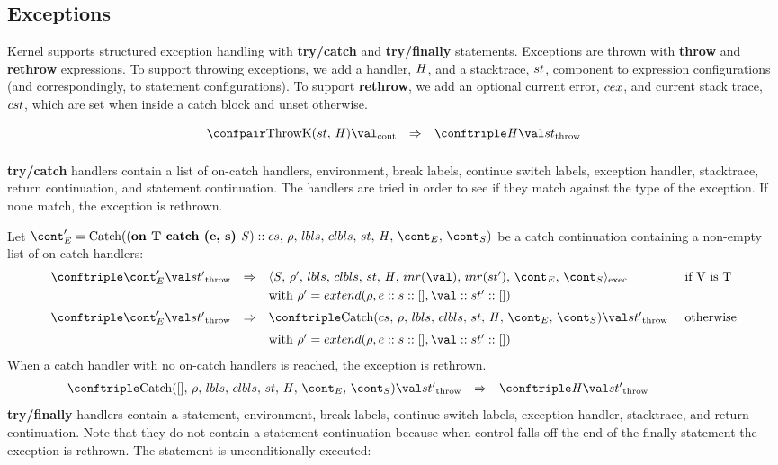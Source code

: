 \documentclass{article}
\begin{document}
\subsection{Exceptions}

Kernel supports structured exception handling with \textbf{try/catch} and \textbf{try/finally} statements. Exceptions are thrown with \textbf{throw} and \textbf{rethrow} expressions. To support throwing exceptions, we add a handler, $\mathit{H}$, and a stacktrace, $st$, component to expression configurations (and correspondingly, to statement configurations). To support \textbf{rethrow}, we add an optional current error, $cex$, and current stack trace, $cst$, which are set when inside a catch block and unset otherwise.

\[
  \begin{array}{lcl}
	\contconf{\ThrowH{\strace}{\handler}}{\val}
	& \Rightarrow &
	\throwconf{\handler}{\val}{\strace}\\[2mm]

  \end{array}
\]

\noindent
\textbf{try/catch} handlers contain a list of on-catch handlers, environment, break labels, continue switch labels, exception handler, stacktrace, return continuation, and statement continuation. The handlers are tried in order to see if they match against the type of the exception. If none match, the exception is rethrown.

\noindent
Let $\econt' = \CatchH{(\textbf{on T catch (e, s) }\stmt) :: cs}$ be a catch continuation containing a non-empty list of on-catch handlers:
\[
  \begin{array}{lcll}
	\throwconf{\econt'}{\val}{\strace'}
	& \Rightarrow &
	\execconf{\stmt}{\env'}{\lbls}{\clbls}{\handler}{inr(\val)}{inr(\strace')}{\econt}{\scont}
	&\textrm{ if V is T}\\[1mm]

	&&\textrm{with } \env' = extend(\env, e :: s :: [], \val :: \strace' :: [])\\[2mm]

	\throwconf{\econt'}{\val}{\strace'}
	& \Rightarrow &
	\throwconf{\CatchH{cs}}{\val}{\strace'}	&\textrm{ otherwise}\\[2mm]
	&&\textrm{with } \env' = extend(\env, e :: s :: [], \val :: \strace' :: [])
  \end{array}
\]
\noindent
When a catch handler with no on-catch handlers is reached, the exception is rethrown.
\[
  \begin{array}{lcll}
	\throwconf{\CatchH{[]}}{\val}{\strace'}
	& \Rightarrow &
	\throwconf{\handler}{\val}{\strace'}\hspace{20mm}
  \end{array}
\]
\noindent
\textbf{try/finally} handlers contain a statement, environment, break labels, continue switch labels, exception handler, stacktrace, and return continuation. Note that they do not contain a statement continuation because when control falls off the end of the finally statement the exception is rethrown. The statement is unconditionally executed:
\end{document}
